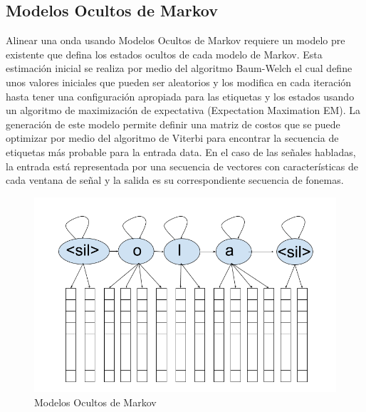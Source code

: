 \subsection{Modelos Ocultos de Markov}

Alinear una onda usando Modelos Ocultos de Markov requiere un modelo pre existente que defina los estados ocultos de cada modelo de Markov. Esta estimación inicial se realiza por medio del algoritmo Baum-Welch \cite{RabinerARecognition} el cual define unos valores iniciales que pueden ser aleatorios y los modifica en cada iteración hasta tener una configuración apropiada para las etiquetas y los estados usando un algoritmo de maximización de expectativa (Expectation Maximation EM). La generación de este modelo permite definir una matriz de costos que se puede optimizar por medio del algoritmo de Viterbi para encontrar la secuencia de etiquetas más probable para la entrada data. En el caso de las señales habladas, la entrada está representada por una secuencia de vectores con características de cada ventana de señal y la salida es su correspondiente secuencia de fonemas.

\begin{figure}[H]

\centering
\caption{Modelos Ocultos de Markov}
\label{img:hmm}
\includegraphics[scale=0.50]{images/hmm.png}
\end{figure}

